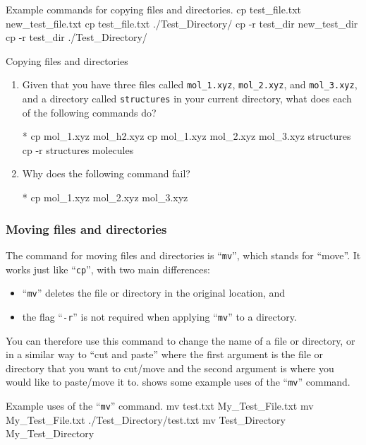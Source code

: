       \begin{bashcmd}[label=listing:copy]{Example commands for copying files and directories.}
        cp test_file.txt new_test_file.txt
        cp test_file.txt ./Test_Directory/
        cp -r test_dir new_test_dir
        cp -r test_dir ./Test_Directory/
      \end{bashcmd}

      \begin{task}[label=task:copy]{Copying files and directories}
        \begin{enumerate}[label=(\alph*)]
          \item Given that you have three files called \texttt{mol\_1.xyz}, \texttt{mol\_2.xyz}, and \texttt{mol\_3.xyz}, and a directory called \texttt{structures} in your current directory, what does each of the following commands do?
          \begin{bashcmd}*{}
            cp mol_1.xyz mol_h2.xyz
            cp mol_1.xyz mol_2.xyz mol_3.xyz structures
            cp -r structures molecules
          \end{bashcmd}
          \item Why does the following command fail?
          \begin{bashcmd}*{}
            cp mol_1.xyz mol_2.xyz mol_3.xyz
          \end{bashcmd}
        \end{enumerate}
      \end{task}

    \subsubsection{Moving files and directories}
      The command for moving files and directories is \enquote{\texttt{mv}}, which stands for \enquote{move}.
      It works just like \enquote{\texttt{cp}}, with two main differences:
      \begin{itemize}
        \item \enquote{\texttt{mv}} deletes the file or directory in the original location, and
        \item the flag \enquote{\texttt{-r}} is not required when applying \enquote{\texttt{mv}} to a directory.
      \end{itemize}
      You can therefore use this command to change the name of a file or directory, or in a similar way to \enquote{cut and paste} where the first argument is the file or directory that you want to cut/move and the second argument is where you would like to paste/move it to.
       shows some example uses of the \enquote{\texttt{mv}} command.
      \begin{bashcmd}[label=listing:move]{Example uses of the \enquote{\texttt{mv}} command.}
          mv test.txt My_Test_File.txt
          mv My_Test_File.txt ./Test_Directory/test.txt
          mv Test_Directory My_Test_Directory
      \end{bashcmd}

